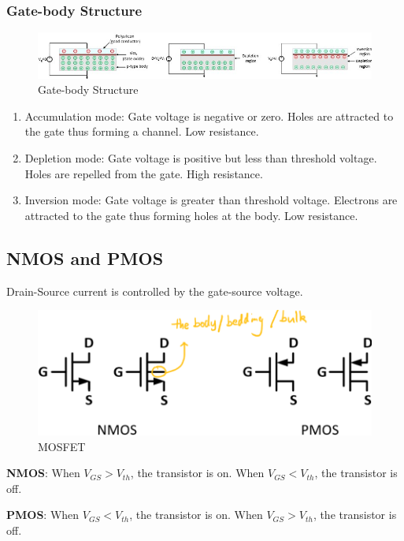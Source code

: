 \subsubsection{Gate-body Structure}
\begin{figure}[h]
    \centering
    \includegraphics[scale=0.7]{images/MOS-device-theory.jpg}
    \caption{Gate-body Structure}
\end{figure}
\begin{enumerate}
    \item Accumulation mode: Gate voltage is negative or zero. Holes are attracted to the gate thus forming a channel. Low resistance.
    \item Depletion mode: Gate voltage is positive but less than threshold voltage. Holes are repelled from the gate. High resistance.
    \item Inversion mode: Gate voltage is greater than threshold voltage. Electrons are attracted to the gate thus forming holes at the body. Low resistance.
\end{enumerate}

\subsection{NMOS and PMOS}

Drain-Source current is controlled by the gate-source voltage.

\begin{figure}[h]
    \centering
    \includegraphics[scale=0.3]{images/NMOSandPMOS.png}
    \caption{MOSFET}
\end{figure}

\textbf{NMOS}: When $V_{GS} > V_{th}$, the transistor is on. When $V_{GS} < V_{th}$, the transistor is off.

\textbf{PMOS}: When $V_{GS} < V_{th}$, the transistor is on. When $V_{GS} > V_{th}$, the transistor is off.

